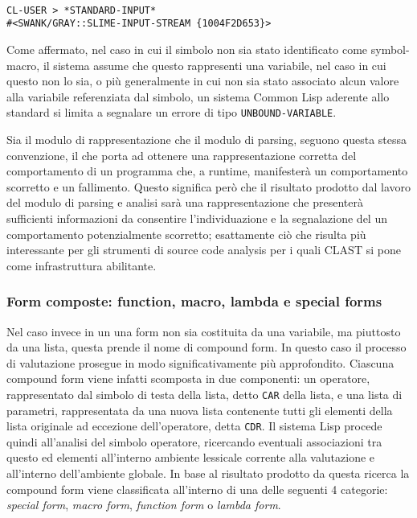\begin{lstlisting}[caption=Esempio di form di tipo symbol]

CL-USER > *STANDARD-INPUT*
#<SWANK/GRAY::SLIME-INPUT-STREAM {1004F2D653}>

\end{lstlisting}

Come affermato, nel caso in cui il simbolo non sia stato identificato come
symbol-macro, il sistema assume che questo rappresenti una variabile, nel caso
in cui questo non lo sia, o più generalmente in cui non sia stato associato
alcun valore alla variabile referenziata dal simbolo, un sistema Common Lisp
aderente allo standard si limita a segnalare un errore di tipo \texttt
{UNBOUND-VARIABLE}.

Sia il modulo di rappresentazione che il modulo di parsing, seguono questa
stessa convenzione, il che porta ad ottenere una rappresentazione corretta del
comportamento di un programma che, a runtime, manifesterà un comportamento
scorretto e un fallimento. Questo significa però che il risultato prodotto dal
lavoro del modulo di parsing e analisi sarà una rappresentazione che presenterà
sufficienti informazioni da consentire l’individuazione e la segnalazione del un
comportamento potenzialmente scorretto; esattamente ciò che risulta più
interessante per gli strumenti di source code analysis per i quali CLAST si pone
come infrastruttura abilitante.\\

\subsubsection{Form composte: function, macro, lambda e special forms}

Nel caso invece in un una form non sia costituita da una variabile, ma piuttosto
da una lista, questa prende il nome di compound form. In questo caso il processo
di valutazione prosegue in modo significativamente più approfondito. Ciascuna
compound form viene infatti scomposta in due componenti: un operatore,
rappresentato dal simbolo di testa della lista, detto \texttt{CAR} della lista,
e una lista di parametri, rappresentata da una nuova lista contenente tutti gli
elementi della lista originale ad eccezione dell’operatore, detta \texttt{CDR}.
Il sistema Lisp procede quindi all'analisi del simbolo operatore, ricercando
eventuali associazioni tra questo ed elementi all’interno ambiente lessicale
corrente alla valutazione e all'interno dell'ambiente globale. In base al
risultato prodotto da questa ricerca la compound form viene classificata
all’interno di una delle seguenti 4 categorie: \textit{special form},
\textit{macro form}, \textit{function form} o \textit{lambda form}.

